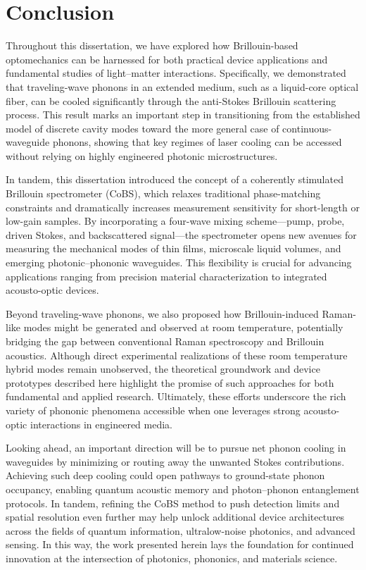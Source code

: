 \chapter{Conclusion}
\label{ch:Conclusion}
\acresetall

Throughout this dissertation, we have explored how Brillouin-based optomechanics can be harnessed for both practical device applications and fundamental studies of light–matter interactions. Specifically, we demonstrated that traveling-wave phonons in an extended medium, such as a liquid-core optical fiber, can be cooled significantly through the anti-Stokes Brillouin scattering process. This result marks an important step in transitioning from the established model of discrete cavity modes toward the more general case of continuous-waveguide phonons, showing that key regimes of laser cooling can be accessed without relying on highly engineered photonic microstructures.

In tandem, this dissertation introduced the concept of a coherently stimulated Brillouin spectrometer (CoBS), which relaxes traditional phase-matching constraints and dramatically increases measurement sensitivity for short-length or low-gain samples. By incorporating a four-wave mixing scheme—pump, probe, driven Stokes, and backscattered signal—the spectrometer opens new avenues for measuring the mechanical modes of thin films, microscale liquid volumes, and emerging photonic–phononic waveguides. This flexibility is crucial for advancing applications ranging from precision material characterization to integrated acousto-optic devices.

Beyond traveling-wave phonons, we also proposed how Brillouin-induced Raman-like modes might be generated and observed at room temperature, potentially bridging the gap between conventional Raman spectroscopy and Brillouin acoustics. Although direct experimental realizations of these room temperature hybrid modes remain unobserved, the theoretical groundwork and device prototypes described here highlight the promise of such approaches for both fundamental and applied research. Ultimately, these efforts underscore the rich variety of phononic phenomena accessible when one leverages strong acousto-optic interactions in engineered media.

Looking ahead, an important direction will be to pursue net phonon cooling in waveguides by minimizing or routing away the unwanted Stokes contributions. Achieving such deep cooling could open pathways to ground-state phonon occupancy, enabling quantum acoustic memory and photon–phonon entanglement protocols. In tandem, refining the CoBS method to push detection limits and spatial resolution even further may help unlock additional device architectures across the fields of quantum information, ultralow-noise photonics, and advanced sensing. In this way, the work presented herein lays the foundation for continued innovation at the intersection of photonics, phononics, and materials science.

\clearpage
\thispagestyle{empty}
\null
\newpage
